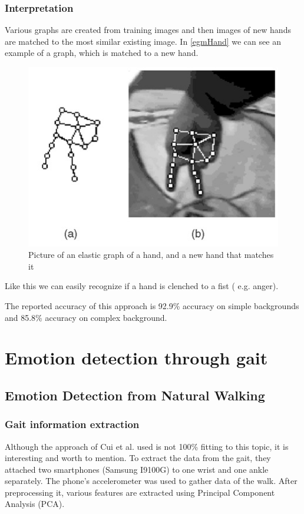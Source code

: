 \documentclass[conference]{IEEEtran}
\begin{document}
\subsubsection{Interpretation}
Various graphs are created from training images and then images of new hands are matched to the most similar existing image. In \autoref{egmHand} we can see an example of a graph, which is matched to a new hand.
\begin{figure}[H]
\centering
\includegraphics[width=\linewidth]{egmHand.jpg}
\caption{Picture of an elastic graph of a hand, and a new hand that matches it\cite{triesch2001system}}
\label{fig:egmHand}
\end{figure}
Like this we can easily recognize if a hand is clenched to a fist ( e.g. anger).

The reported accuracy of this approach is 92.9\% accuracy on simple backgrounds and 85.8\% accuracy on complex background.

\section{Emotion detection through gait}
\label{sec:emotionGait}
\subsection{Emotion Detection from Natural Walking}
\label{subsec:EDNW}
\subsubsection{Gait information extraction}
Although the approach of Cui et al.\cite{cui2016emotion} used is not 100\% fitting to this topic, it is interesting and worth to mention. To extract the data from the gait, they attached two smartphones (Samsung I9100G) to one wrist and one ankle separately\cite{cui2016emotion}.  The phone's accelerometer was used to gather data of the walk. After preprocessing it, various features are extracted using Principal Component Analysis (PCA)\cite{cui2016emotion}.\
\end{document}
